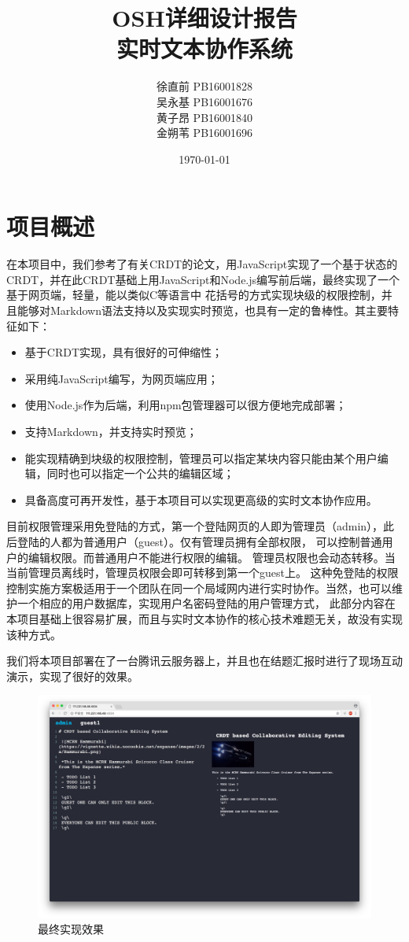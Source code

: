 \documentclass[11pt]{ctexart}
\title{OSH详细设计报告\\[2ex]实时文本协作系统}
\author{徐直前 PB16001828\\吴永基 PB16001676\\黄子昂 PB16001840\\金朔苇 PB16001696\\}
\date{\today}
\begin{document}
\maketitle
\tableofcontents

\section{项目概述}
在本项目中，我们参考了有关CRDT的论文，用JavaScript实现了一个基于状态的CRDT，并在此CRDT基础上用JavaScript和Node.js编写前后端，最终实现了一个基于网页端，轻量，能以类似C等语言中
花括号的方式实现块级的权限控制，并且能够对Markdown语法支持以及实现实时预览，也具有一定的鲁棒性。其主要特征如下：
\begin{itemize}
    \item 基于CRDT实现，具有很好的可伸缩性；
    \item 采用纯JavaScript编写，为网页端应用；
    \item 使用Node.js作为后端，利用npm包管理器可以很方便地完成部署；
    \item 支持Markdown，并支持实时预览；
    \item 能实现精确到块级的权限控制，管理员可以指定某块内容只能由某个用户编辑，同时也可以指定一个公共的编辑区域；
    \item 具备高度可再开发性，基于本项目可以实现更高级的实时文本协作应用。
\end{itemize}

目前权限管理采用免登陆的方式，第一个登陆网页的人即为管理员（admin），此后登陆的人都为普通用户（guest）。仅有管理员拥有全部权限，
可以控制普通用户的编辑权限。而普通用户不能进行权限的编辑。
管理员权限也会动态转移。当当前管理员离线时，管理员权限会即可转移到第一个guest上。
这种免登陆的权限控制实施方案极适用于一个团队在同一个局域网内进行实时协作。当然，也可以维护一个相应的用户数据库，实现用户名密码登陆的用户管理方式，
此部分内容在本项目基础上很容易扩展，而且与实时文本协作的核心技术难题无关，故没有实现该种方式。

我们将本项目部署在了一台腾讯云服务器上，并且也在结题汇报时进行了现场互动演示，实现了很好的效果。
\begin{figure}[ht]
    \begin{center}
    \includegraphics[width=\textwidth]{figures/demo.png}
    \caption{最终实现效果}
    \end{center}
\end{figure}
\end{document}
